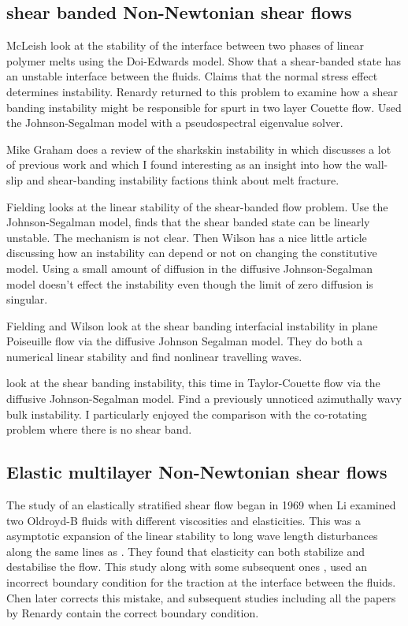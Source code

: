 \documentclass{jfm}
\begin{document}
\subsection{shear banded Non-Newtonian shear flows}

McLeish \citep{McLeish1987} look at the stability of the interface between two
phases of linear polymer melts using the Doi-Edwards model. Show that a
shear-banded state has an unstable interface between the fluids. Claims that
the normal stress effect determines instability. Renardy \citep{Renardy1995a}
returned to this problem to examine how a shear banding instability might be
responsible for spurt in two layer Couette flow.  Used the Johnson-Segalman
model with a pseudospectral eigenvalue solver. 

Mike Graham does a review of the sharkskin instability in \citep{Graham1999}
which discusses a lot of previous work and which I found interesting as an
insight into how the wall-slip and shear-banding instability factions think
about melt fracture.

Fielding \citep{Fielding2005} looks at the linear stability of the shear-banded
flow problem. Use the Johnson-Segalman model, finds that the shear banded state
can be linearly unstable. The mechanism is not clear. Then Wilson
\citep{Wilson2006} has a nice little article discussing how an instability can
depend or not on changing the constitutive model. Using a small amount of
diffusion in the diffusive Johnson-Segalman model doesn't effect the
instability even though the limit of zero diffusion is singular.

Fielding and Wilson \citep{Fielding2010} look at the shear banding interfacial
instability in plane Poiseuille flow via the diffusive Johnson Segalman model.
They do both a numerical linear stability and find nonlinear travelling
waves.

\citet{Nicolas2012} look at the shear banding instability, this
time in Taylor-Couette flow via the diffusive Johnson-Segalman model. Find a
previously unnoticed azimuthally wavy bulk instability. I particularly enjoyed
the comparison with the co-rotating problem where there is no shear band.

\subsection{Elastic multilayer Non-Newtonian shear flows}

The study of an elastically stratified shear flow began in 1969 when Li
\citep{Li1969} examined two Oldroyd-B fluids with different viscosities and
elasticities. This was a asymptotic expansion of the linear stability to long
wave length disturbances along the same lines as \citet{Yih1967}. They found
that elasticity can both stabilize and destabilise the flow. This study along
with some subsequent ones \citep{Waters1987, Anturkar1990}, used an incorrect
boundary condition for the traction at the interface between the fluids. Chen
\citep{Chen1991b} later corrects this mistake, and subsequent studies including
all the papers by Renardy contain the correct boundary condition.
\end{document}
